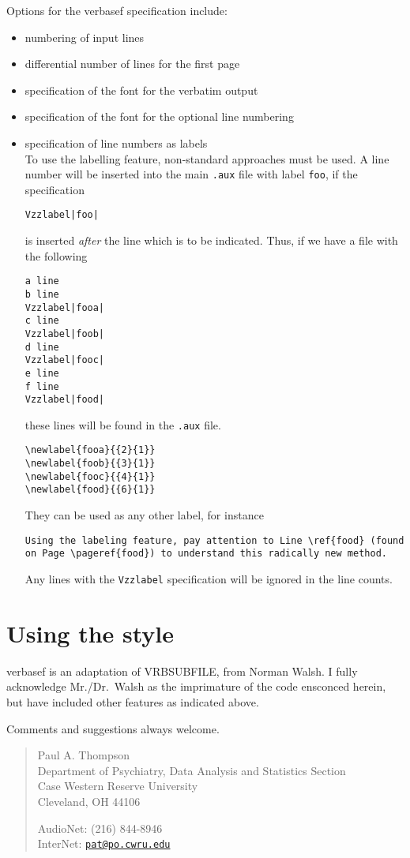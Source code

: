 \documentclass[pagesize=auto]{scrartcl}
\newcommand*{\mail}[1]{\href{mailto:#1}{\texttt{#1}}}
\newcommand*{\pkg}[1]{\textsf{#1}}
\begin{document}
Options for the verbasef specification include:
%
\begin{itemize}
\item numbering of input lines
\item differential number of lines for the first page
\item specification of the font for the verbatim output
\item specification of the font for the optional line numbering
\item specification of line numbers as labels \\
   To use the labelling feature, non-standard approaches must be used.
   A line number will be inserted into the main \texttt{.aux} file with label \texttt{foo},
   if the specification 
\begin{verbatim}
Vzzlabel|foo|
\end{verbatim}
   is inserted \emph{after} the line which is to be indicated.  Thus, if we have 
   a file with the following
\begin{verbatim}
a line
b line
Vzzlabel|fooa|
c line
Vzzlabel|foob|
d line
Vzzlabel|fooc|
e line
f line
Vzzlabel|food|
\end{verbatim}
   these lines will be found in the \texttt{.aux} file.
\begin{verbatim}
\newlabel{fooa}{{2}{1}}
\newlabel{foob}{{3}{1}}
\newlabel{fooc}{{4}{1}}
\newlabel{food}{{6}{1}}
\end{verbatim}
   They can be used as any other label, for instance 
\begin{verbatim}
Using the labeling feature, pay attention to Line \ref{food} (found
on Page \pageref{food}) to understand this radically new method.
\end{verbatim}

   Any lines with the \texttt{Vzzlabel} specification will be ignored in the 
   line counts.
\end{itemize}


\section{Using the style}

\pkg{verbasef} is an adaptation of \pkg{VRBSUBFILE}, from Norman Walsh.  
I fully acknowledge Mr./Dr.~Walsh as the imprimature of the code ensconced
herein, but have included other features as indicated above.

Comments and suggestions always welcome.
%
\begin{verse}
  Paul A. Thompson \\
  Department of Psychiatry, Data Analysis and Statistics Section \\
  Case Western Reserve University \\
  Cleveland, OH 44106
  
  AudioNet: (216) 844-8946 \\
  InterNet: \mail{pat@po.cwru.edu}
\end{verse}
\end{document}
